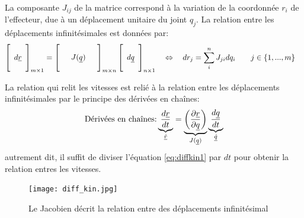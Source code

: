 La composante $J_{ij}$ de la matrice correspond à la variation de la coordonnée $r_i$ de l'effecteur, due à un déplacement unitaire du joint $q_j$. La relation entre les déplacements infinitésimales est données par:
\begin{align}
\left[ \begin{array}{c}  \\ d\underline{r} \\ \\
\end{array} \right]_{m \times 1}
&= 
\left[ \begin{array}{c c c} 
&&\\
& J(\underline{q}) &\\
&&
\end{array} \right]_{m \times n}
\left[ \begin{array}{c} 
\\ d\underline{q} \\ \\
\end{array} \right]_{n \times 1}
\quad \Leftrightarrow \quad
dr_j
= \sum_i^n{
J_{ji} 
dq_i
}
\quad \quad j \in \left\{ 1 , ... , m \right\}
\label{eq:diffkin1}
\end{align}


La relation qui relit les vitesses est relié à la relation entre les déplacements infinitésimales par le principe des dérivées en chaînes:
\begin{equation}
\text{Dérivées en chaînes:} 
\underbrace{
\frac{d \underline{r}}{dt}
}_{\underline{\dot{r}}}
= 
\underbrace{
\left( \frac{\partial \underline{r}}{\partial \underline{q}} \right)
}_{J(\underline{q})}
\underbrace{
\frac{d \underline{q}}{dt}
}_{\underline{\dot{q}}}
\end{equation}
autrement dit, il suffit de diviser l'équation \eqref{eq:diffkin1} par $dt$ pour obtenir la relation entres les vitesses. 

\begin{figure}[H]
	\centering
		\texttt{[image: diff\_kin.jpg]}
	\caption{Le Jacobien décrit la relation entre des déplacements infinitésimal}
	\label{fig:diff_kin_variation}
\end{figure}

